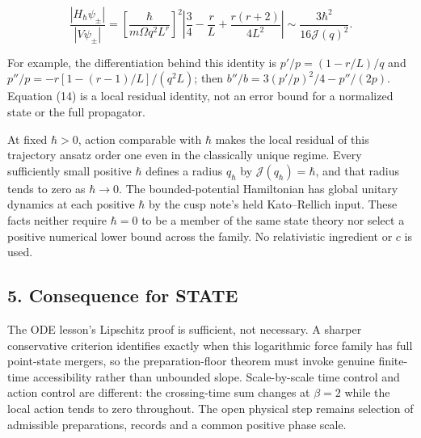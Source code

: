 \documentclass[11pt,a4paper]{article}
\begin{document}
\[
 \frac{|H_\hbar\psi_\pm|}{|V\psi_\pm|}
 =\left[\frac{\hbar}{m\Omega q^2L^r}\right]^2
       \left|\frac34-\frac rL+\frac{r(r+2)}{4L^2}\right|
 \sim\frac{3\hbar^2}{16\mathcal J(q)^2}.
 \tag{14}
\]

For example, the differentiation behind this identity is
\(p'/p=(1-r/L)/q\) and \(p''/p=-r[1-(r-1)/L]/(q^2L)\); then
\(b''/b=3(p'/p)^2/4-p''/(2p)\). Equation (14) is a local residual
identity, not an error bound for a normalized state or the full
propagator.

At fixed \(\hbar>0\), action comparable with \(\hbar\) makes the local
residual of this trajectory ansatz order one even in the classically
unique regime. Every sufficiently small positive \(\hbar\) defines a
radius \(q_\hbar\) by \(\mathcal J(q_\hbar)=\hbar\), and that radius
tends to zero as \(\hbar\to0\). The bounded-potential Hamiltonian has
global unitary dynamics at each positive \(\hbar\) by the cusp note's
held Kato--Rellich input. These facts neither require \(\hbar=0\) to be
a member of the same state theory nor select a positive numerical lower
bound across the family. No relativistic ingredient or \(c\) is used.

\subsection{5. Consequence for STATE}\label{consequence-for-state}

The ODE lesson's Lipschitz proof is sufficient, not necessary. A sharper
conservative criterion identifies exactly when this logarithmic force
family has full point-state mergers, so the preparation-floor theorem
must invoke genuine finite-time accessibility rather than unbounded
slope. Scale-by-scale time control and action control are different: the
crossing-time sum changes at \(\beta=2\) while the local action tends to
zero throughout. The open physical step remains selection of admissible
preparations, records and a common positive phase scale.
\end{document}
